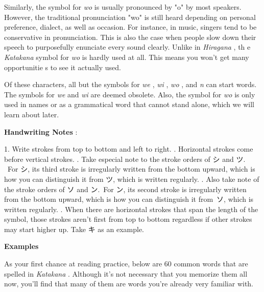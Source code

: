 \par{ Similarly, the symbol for \emph{wo }is usually pronounced by "o" by most speakers. However, the traditional pronunciation "wo" is still heard depending on personal preference, dialect, as well as occasion. For instance, in music, singers tend to be conservative in pronunciation. This is also the case when people slow down their speech to purposefully enunciate every sound clearly. Unlike in \emph{Hiragana }, th e \emph{Katakana }symbol for \emph{wo }is hardly used at all. This means you won't get many opportunitie s to see it actually used. }

\par{ Of these characters, all but the symbols for \emph{we }, \emph{wi }, \emph{wo }, and \emph{n }can start words. The symbols for \emph{we }and \emph{wi }are deemed obsolete. Also, the symbol for \emph{wo }is only used in names or as a grammatical word that cannot stand alone, which we will learn about later. }

\par{\textbf{Handwriting Notes }: }

\par{1. Write strokes from top to bottom and left to right. \hfill{}. Horizontal strokes come before vertical strokes. \hfill{}. Take especial note to the stroke orders of シ and ツ.  For シ, its third stroke is irregularly written from the bottom upward, which is how you can distinguish it from ツ, which is written regularly. \hfill{}. Also take note of the stroke orders of ソ and ン. For ン, its second stroke is irregularly written from the bottom upward, which is how you can distinguish it from ソ, which is written regularly. \hfill{}. When there are horizontal strokes that span the length of the symbol, those strokes aren't first from top to bottom regardless if other strokes may start higher up. Take キ as an example. }

\begin{center}
\textbf{Examples } 
\end{center}

\par{ As your first chance at reading practice, below are 60 common words that are spelled in \emph{Katakana }. Although it's not necessary that you memorize them all now, you'll find that many of them are words you're already very familiar with. }

